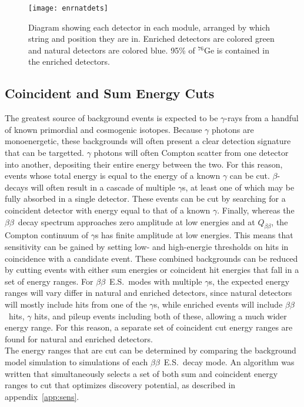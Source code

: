 \documentclass[notitlepage,rmp,aps,10pt]{revtex4-1}
\newcommand{\bb}{${\beta \beta}$}
\newcommand{\bbes}{\bb~E.S.}
\newcommand{\Qbb}{$Q_{\beta\beta}$}
\newcommand{\iso}[2]{$^{#1}$#2}
\newcommand{\Ge}[1]{\iso{#1}{Ge}}
\begin{document}
\begin{figure}[h]
  \centering
  \texttt{[image: enrnatdets]}
  \caption[Module 1 and Module 2 enriched and natural detectors]{\label{fig:Ge76BBLevelDiagram}
    Diagram showing each detector in each module, arranged by which string and position they are in. Enriched detectors are colored green and natural detectors are colored blue. 95\% of \Ge{76} is contained in the enriched detectors.}
\end{figure}

\subsection{Coincident and Sum Energy Cuts} \label{sec:MSenergycuts}
The greatest source of background events is expected to be $\gamma$-rays from a handful of known primordial and cosmogenic isotopes.
Because $\gamma$ photons are monoenergetic, these backgrounds will often present a clear detection signature that can be targetted.
$\gamma$ photons will often Compton scatter from one detector into another, depositing their entire energy between the two.
For this reason, events whose total energy is equal to the energy of a known $\gamma$ can be cut.
$\beta$-decays will often result in a cascade of multiple $\gamma$s, at least one of which may be fully absorbed in a single detector.
These events can be cut by searching for a coincident detector with energy equal to that of a known $\gamma$.
Finally, whereas the \bb\ decay spectrum approaches zero amplitude at low energies and at \Qbb, the Compton continuum of $\gamma$s has finite amplitude at low energies.
This means that sensitivity can be gained by setting low- and high-energie thresholds on hits in coincidence with a candidate event.
These combined backgrounds can be reduced by cutting events with either sum energies or coincident hit energies that fall in a set of energy ranges.
For \bbes\ modes with multiple $\gamma$s, the expected energy ranges will vary differ in natural and enriched detectors, since natural detectors will mostly include hits from one of the $\gamma$s, while enriched events will include \bb\ hits, $\gamma$ hits, and pileup events including both of these, allowing a much wider energy range.
For this reason, a separate set of coincident cut energy ranges are found for natural and enriched detectors.
\\
The energy ranges that are cut can be determined by comparing the background model simulation to simulations of each \bbes\ decay mode.
An algorithm was written that simultaneously selects a set of both sum and coincident energy ranges to cut that optimizes discovery potential, as described in appendix~\ref{app:sens}.
\end{document}
